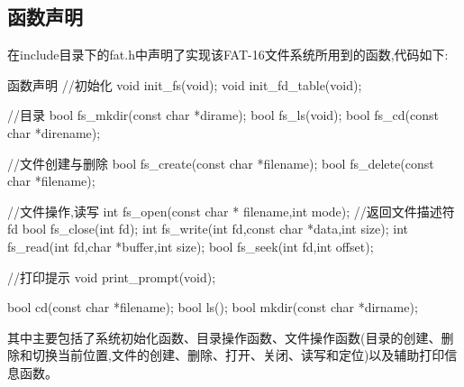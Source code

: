 \subsection{函数声明}
在include目录下的fat.h中声明了实现该FAT-16文件系统所用到的函数,代码如下:
\begin{ccode}{函数声明}
//初始化
void init_fs(void);
void init_fd_table(void);

//目录
bool fs_mkdir(const char *dirame);
bool fs_ls(void);
bool fs_cd(const char *direname);


//文件创建与删除
bool fs_create(const char *filename);
bool fs_delete(const char *filename);

//文件操作,读写
int fs_open(const char * filename,int mode); //返回文件描述符fd
bool fs_close(int fd);
int fs_write(int fd,const char *data,int size);
int fs_read(int fd,char *buffer,int size);
bool fs_seek(int fd,int offset);


//打印提示
void print_prompt(void);

bool cd(const char *filename);
bool ls();
bool mkdir(const char *dirname);
\end{ccode}
其中主要包括了系统初始化函数、目录操作函数、文件操作函数(目录的创建、删除和切换当前位置,文件的创建、删除、打开、关闭、读写和定位)以及辅助打印信息函数。